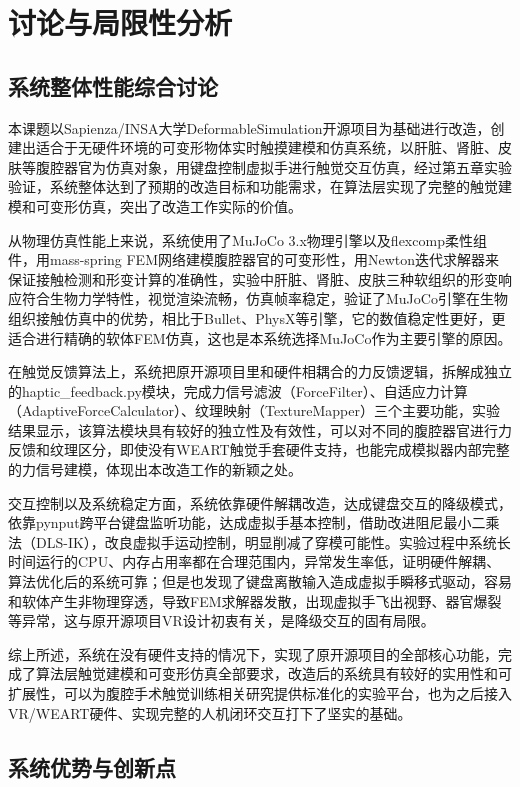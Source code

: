\section{讨论与局限性分析}

\subsection{系统整体性能综合讨论}
本课题以Sapienza/INSA大学DeformableSimulation开源项目为基础进行改造，创建出适合于无硬件环境的可变形物体实时触摸建模和仿真系统，以肝脏、肾脏、皮肤等腹腔器官为仿真对象，用键盘控制虚拟手进行触觉交互仿真，经过第五章实验验证，系统整体达到了预期的改造目标和功能需求，在算法层实现了完整的触觉建模和可变形仿真，突出了改造工作实际的价值。

从物理仿真性能上来说，系统使用了MuJoCo 3.x物理引擎以及flexcomp柔性组件，用mass-spring FEM网络建模腹腔器官的可变形性，用Newton迭代求解器来保证接触检测和形变计算的准确性，实验中肝脏、肾脏、皮肤三种软组织的形变响应符合生物力学特性，视觉渲染流畅，仿真帧率稳定，验证了MuJoCo引擎在生物组织接触仿真中的优势，相比于Bullet、PhysX等引擎，它的数值稳定性更好，更适合进行精确的软体FEM仿真，这也是本系统选择MuJoCo作为主要引擎的原因。

在触觉反馈算法上，系统把原开源项目里和硬件相耦合的力反馈逻辑，拆解成独立的haptic\_feedback.py模块，完成力信号滤波（ForceFilter）、自适应力计算（AdaptiveForceCalculator）、纹理映射（TextureMapper）三个主要功能，实验结果显示，该算法模块具有较好的独立性及有效性，可以对不同的腹腔器官进行力反馈和纹理区分，即使没有WEART触觉手套硬件支持，也能完成模拟器内部完整的力信号建模，体现出本改造工作的新颖之处。

交互控制以及系统稳定方面，系统依靠硬件解耦改造，达成键盘交互的降级模式，依靠pynput跨平台键盘监听功能，达成虚拟手基本控制，借助改进阻尼最小二乘法（DLS-IK），改良虚拟手运动控制，明显削减了穿模可能性。实验过程中系统长时间运行的CPU、内存占用率都在合理范围内，异常发生率低，证明硬件解耦、算法优化后的系统可靠；但是也发现了键盘离散输入造成虚拟手瞬移式驱动，容易和软体产生非物理穿透，导致FEM求解器发散，出现虚拟手飞出视野、器官爆裂等异常，这与原开源项目VR设计初衷有关，是降级交互的固有局限。

综上所述，系统在没有硬件支持的情况下，实现了原开源项目的全部核心功能，完成了算法层触觉建模和可变形仿真全部要求，改造后的系统具有较好的实用性和可扩展性，可以为腹腔手术触觉训练相关研究提供标准化的实验平台，也为之后接入VR/WEART硬件、实现完整的人机闭环交互打下了坚实的基础。

\subsection{系统优势与创新点}

